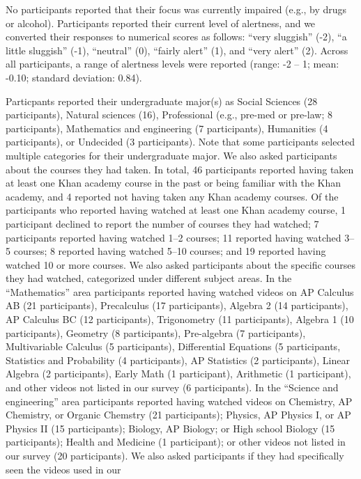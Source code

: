 \documentclass[10pt]{article}
\begin{document}
No participants reported that their focus was currently impaired
(e.g., by drugs or alcohol).  Participants reported their current
level of alertness, and we converted their responses to numerical
scores as follows: ``very sluggish'' (-2), ``a little sluggish'' (-1),
``neutral'' (0), ``fairly alert'' (1), and ``very alert'' (2). Across
all participants, a range of alertness levels were reported (range: -2
-- 1; mean: -0.10; standard deviation: 0.84).

Particpants reported their undergraduate major(s) as Social Sciences
(28 participants), Natural sciences (16), Professional (e.g., pre-med
or pre-law; 8 participants), Mathematics and engineering (7
participants), Humanities (4 participants), or Undecided (3
participants).  Note that some participants selected multiple
categories for their undergraduate major.  We also asked participants
about the courses they had taken.  In total, 46 participants reported
having taken at least one Khan academy course in the past or being
familiar with the Khan academy, and 4 reported not having taken any
Khan academy courses.  Of the participants who reported having watched
at least one Khan academy course, 1 participant declined to report the
number of courses they had watched; 7 participants reported having
watched 1--2 courses; 11 reported having watched 3--5 courses; 8
reported having watched 5--10 courses; and 19 reported having watched
10 or more courses.  We also asked participants about the specific
courses they had watched, categorized under different subject areas.
In the ``Mathematics'' area participants reported having watched
videos on AP Calculus AB (21 participants), Precalculus (17
participants), Algebra 2 (14 participants), AP Calculus BC (12
participants), Trigonometry (11 participants), Algebra 1 (10
participants), Geometry (8 participants), Pre-algebra (7
participants), Multivariable Calculus (5 participants), Differential
Equations (5 participants, Statistics and Probability (4
participants), AP Statistics (2 participants), Linear Algebra (2
participants), Early Math (1 participant), Arithmetic (1 participant),
and other videos not listed in our survey (6 participants).  In the ``Science and engineering''
area participants reported having watched videos on Chemistry, AP
Chemistry, or Organic Chemstry (21
participants); Physics, AP Physics I, or AP Physics II (15 participants); Biology, AP
Biology; or High school Biology (15 participants); Health and Medicine
(1 participant); or other videos not listed in our survey (20 participants).  We also asked
participants if they had specifically seen the videos used in our
\end{document}
